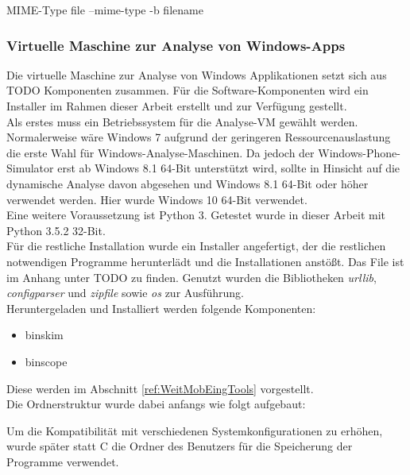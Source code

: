 MIME-Type
file --mime-type -b filename

\subsubsection{Virtuelle Maschine zur Analyse von Windows-Apps}
Die virtuelle Maschine zur Analyse von Windows Applikationen setzt sich aus TODO Komponenten zusammen. Für die Software-Komponenten wird ein Installer im Rahmen dieser Arbeit erstellt und zur Verfügung gestellt.\\

Als erstes muss ein Betriebssystem für die Analyse-VM gewählt werden. Normalerweise wäre Windows 7 aufgrund der geringeren Ressourcenauslastung die erste Wahl für Windows-Analyse-Maschinen. Da jedoch der Windows-Phone-Simulator erst ab Windows 8.1 64-Bit unterstützt wird, sollte in Hinsicht auf die dynamische Analyse davon abgesehen und Windows 8.1 64-Bit oder höher verwendet werden. Hier wurde Windows 10 64-Bit verwendet.\\

Eine weitere Voraussetzung ist Python 3. Getestet wurde in dieser Arbeit mit Python 3.5.2 32-Bit.\\

Für die restliche Installation wurde ein Installer angefertigt, der die restlichen notwendigen Programme herunterlädt und die Installationen anstößt. Das File ist im Anhang unter TODO zu finden. Genutzt wurden die Bibliotheken \textit{urllib}, \textit{configparser} und \textit{zipfile} sowie \textit{os} zur Ausführung.\\

Heruntergeladen und Installiert werden folgende Komponenten:
\begin{itemize}
	\item binskim
	\item binscope
\end{itemize}

Diese werden im Abschnitt \ref{ref:WeitMobEingTools} vorgestellt.\\

Die Ordnerstruktur wurde dabei anfangs wie folgt aufgebaut:

Um die Kompatibilität mit verschiedenen Systemkonfigurationen zu erhöhen, wurde später statt C die Ordner des Benutzers für die Speicherung der Programme verwendet.\\

